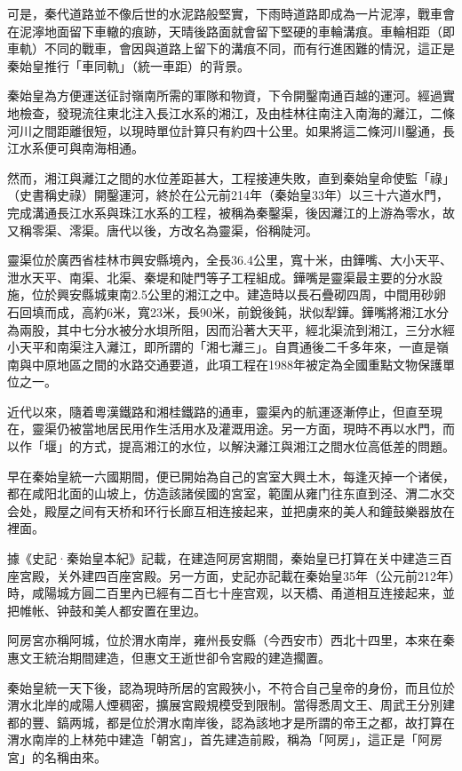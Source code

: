 可是，秦代道路並不像后世的水泥路般堅實，下雨時道路即成為一片泥濘，戰車會在泥濘地面留下車轍的痕跡，天晴後路面就會留下堅硬的車輪溝痕。車輪相距（即車軌）不同的戰車，會因與道路上留下的溝痕不同，而有行進困難的情況，這正是秦始皇推行「車同軌」（統一車距）的背景。

秦始皇為方便運送征討嶺南所需的軍隊和物資，下令開鑿南通百越的運河。經過實地檢查，發現流往東北注入長江水系的湘江，及由桂林往南注入南海的灕江，二條河川之間距離很短，以現時單位計算只有約四十公里。如果將這二條河川鑿通，長江水系便可與南海相通。

然而，湘江與灕江之間的水位差距甚大，工程接連失敗，直到秦始皇命使監「祿」（史書稱史祿）開鑿運河，終於在公元前214年（秦始皇33年）以三十六道水門，完成溝通長江水系與珠江水系的工程，被稱為秦鑿渠，後因灕江的上游為零水，故又稱零渠、澪渠。唐代以後，方改名為靈渠，俗稱陡河。

靈渠位於廣西省桂林市興安縣境內，全長36.4公里，寬十米，由鏵嘴、大小天平、泄水天平、南渠、北渠、秦堤和陡門等子工程組成。鏵嘴是靈渠最主要的分水設施，位於興安縣城東南2.5公里的湘江之中。建造時以長石疊砌四周，中間用砂卵石回填而成，高約6米，寬23米，長90米，前銳後鈍，狀似犁鏵。鏵嘴將湘江水分為兩股，其中七分水被分水垻所阻，因而沿著大天平，經北渠流到湘江，三分水經小天平和南渠注入灕江，即所謂的「湘七灕三」。自貫通後二千多年來，一直是嶺南與中原地區之間的水路交通要道，此項工程在1988年被定為全國重點文物保護單位之一。

近代以來，隨着粵漢鐵路和湘桂鐵路的通車，靈渠內的航運逐漸停止，但直至現在，靈渠仍被當地居民用作生活用水及灌溉用途。另一方面，現時不再以水門，而以作「堰」的方式，提高湘江的水位，以解決灕江與湘江之間水位高低差的問題。

早在秦始皇統一六國期間，便已開始為自己的宮室大興土木，每逢灭掉一个诸侯，都在咸阳北面的山坡上，仿造該諸侯國的宮室，範圍从雍门往东直到泾、渭二水交会处，殿屋之间有天桥和环行长廊互相连接起来，並把虜來的美人和鐘鼓樂器放在裡面。

據《史記·秦始皇本紀》記載，在建造阿房宮期間，秦始皇已打算在关中建造三百座宮殿，关外建四百座宮殿。另一方面，史記亦記載在秦始皇35年（公元前212年）時，咸陽城方圓二百里內已經有二百七十座宫观，以天橋、甬道相互连接起来，並把帷帐、钟鼓和美人都安置在里边。

阿房宮亦稱阿城，位於渭水南岸，雍州長安縣（今西安市）西北十四里，本來在秦惠文王統治期間建造，但惠文王逝世卻令宮殿的建造擱置。

秦始皇統一天下後，認為現時所居的宮殿狹小，不符合自己皇帝的身份，而且位於渭水北岸的咸陽人煙稠密，擴展宮殿規模受到限制。當得悉周文王、周武王分別建都的豐、鎬两城，都是位於渭水南岸後，認為該地才是所謂的帝王之都，故打算在渭水南岸的上林苑中建造「朝宮」，首先建造前殿，稱為「阿房」，這正是「阿房宮」的名稱由來。

